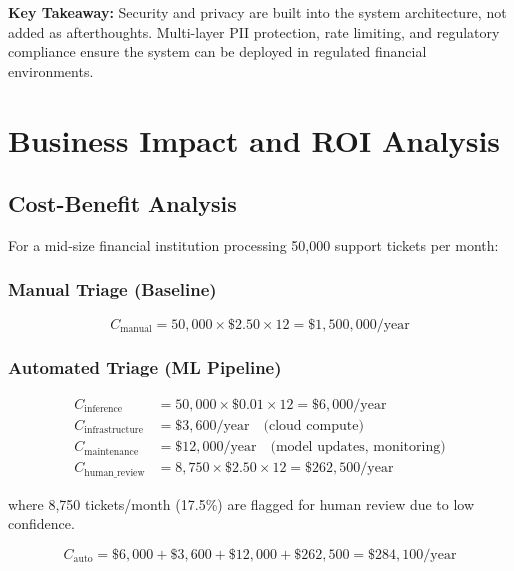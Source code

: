 \documentclass[12pt,a4paper]{article}
\begin{document}
\begin{tipbox}
\textbf{Key Takeaway:} Security and privacy are built into the system architecture, not added as afterthoughts. Multi-layer PII protection, rate limiting, and regulatory compliance ensure the system can be deployed in regulated financial environments.
\end{tipbox}

\newpage
\section{Business Impact and ROI Analysis}
\label{sec:business}

\subsection{Cost-Benefit Analysis}
\label{subsec:cost-benefit}

For a mid-size financial institution processing 50,000 support tickets per month:

\subsubsection{Manual Triage (Baseline)}
\begin{equation}
    C_{\text{manual}} = 50{,}000 \times \$2.50 \times 12 = \$1{,}500{,}000/\text{year}
\end{equation}

\subsubsection{Automated Triage (ML Pipeline)}
\begin{align}
    C_{\text{inference}} &= 50{,}000 \times \$0.01 \times 12 = \$6{,}000/\text{year} \\
    C_{\text{infrastructure}} &= \$3{,}600/\text{year} \quad \text{(cloud compute)} \\
    C_{\text{maintenance}} &= \$12{,}000/\text{year} \quad \text{(model updates, monitoring)} \\
    C_{\text{human\_review}} &= 8{,}750 \times \$2.50 \times 12 = \$262{,}500/\text{year}
\end{align}

where 8,750 tickets/month (17.5\%) are flagged for human review due to low confidence.

\begin{equation}
    C_{\text{auto}} = \$6{,}000 + \$3{,}600 + \$12{,}000 + \$262{,}500 = \$284{,}100/\text{year}
\end{equation}
\end{document}
